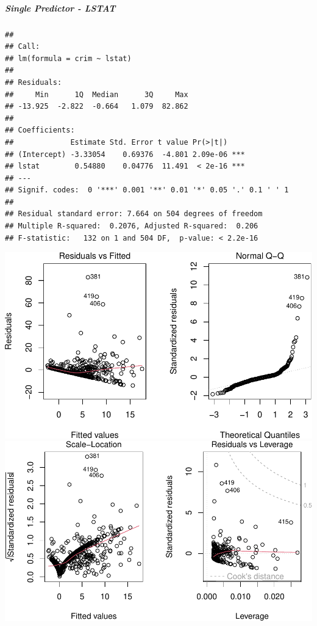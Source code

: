 \documentclass[
]{article}
\begin{document}
\hypertarget{single-predictor---lstat}{%
\subparagraph{\texorpdfstring{\textbf{Single Predictor -
LSTAT}}{Single Predictor - LSTAT}}\label{single-predictor---lstat}}

\begin{verbatim}
## 
## Call:
## lm(formula = crim ~ lstat)
## 
## Residuals:
##     Min      1Q  Median      3Q     Max 
## -13.925  -2.822  -0.664   1.079  82.862 
## 
## Coefficients:
##             Estimate Std. Error t value Pr(>|t|)    
## (Intercept) -3.33054    0.69376  -4.801 2.09e-06 ***
## lstat        0.54880    0.04776  11.491  < 2e-16 ***
## ---
## Signif. codes:  0 '***' 0.001 '**' 0.01 '*' 0.05 '.' 0.1 ' ' 1
## 
## Residual standard error: 7.664 on 504 degrees of freedom
## Multiple R-squared:  0.2076, Adjusted R-squared:  0.206 
## F-statistic:   132 on 1 and 504 DF,  p-value: < 2.2e-16
\end{verbatim}

\includegraphics{Disha_Gandhi_Take_Home_Exam_PDF_files/figure-latex/unnamed-chunk-29-1.pdf}
\includegraphics{Disha_Gandhi_Take_Home_Exam_PDF_files/figure-latex/unnamed-chunk-29-2.pdf}
\end{document}
